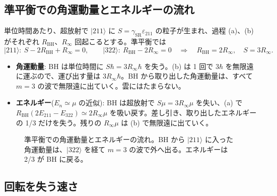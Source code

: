 \subsection{準平衡での角運動量とエネルギーの流れ}

単位時間あたり、超放射で $|211\rangle$ に $S=\gamma_\mathrm{SR}\varepsilon_{211}$ の粒子が生まれ、過程 (a)、(b) がそれぞれ $R_\mathrm{BH}$、$R_\infty$ 回起こるとする。準平衡では
\begin{equation}
|211\rangle:\ S-2R_\mathrm{BH}+R_\infty=0,\qquad |322\rangle:\ R_\mathrm{BH}-2R_\infty=0
\quad\Longrightarrow\quad
R_\mathrm{BH}=2R_\infty,\quad S=3R_\infty.
\end{equation}
\begin{itemize}
\item \textbf{角運動量}: BH は単位時間に $S\hbar=3R_\infty\hbar$ を失う。(b) は 1 回で $3\hbar$ を無限遠に運ぶので、運び出す量は $3R_\infty\hbar$。BH から取り出した角運動量は、すべて $m=3$ の波で無限遠に出ていく。雲にはたまらない。
\item \textbf{エネルギー}($E_n\simeq\mu$ の近似): BH は超放射で $S\mu=3R_\infty\mu$ を失い、(a) で $R_\mathrm{BH}(2E_{211}-E_{322})\simeq2R_\infty\mu$ を吸い戻す。差し引き、取り出したエネルギーの 1/3 だけを失う。残りの $R_\infty\mu$ は (b) で無限遠に出ていく。
\end{itemize}

\begin{figure}[H]
\centering

\caption{準平衡での角運動量とエネルギーの流れ。BH から $|211\rangle$ に入った角運動量は、$|322\rangle$ を経て $m=3$ の波で外へ出る。エネルギーは 2/3 が BH に戻る。}
\label{fig:flow}
\end{figure}

\subsection{回転を失う速さ}

